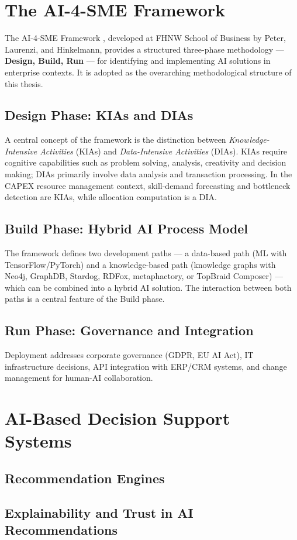 \section{The AI-4-SME Framework}
\label{sec:ai4sme_background}

The AI-4-SME Framework \citep{peter2025ai4sme}, developed at FHNW School of Business by Peter, Laurenzi, and Hinkelmann, provides a structured three-phase methodology — \textbf{Design, Build, Run} — for identifying and implementing AI solutions in enterprise contexts. It is adopted as the overarching methodological structure of this thesis.

\subsection{Design Phase: KIAs and DIAs}

A central concept of the framework is the distinction between \textit{Knowledge-Intensive Activities} (KIAs) and \textit{Data-Intensive Activities} (DIAs). KIAs require cognitive capabilities such as problem solving, analysis, creativity and decision making; DIAs primarily involve data analysis and transaction processing. In the CAPEX resource management context, skill-demand forecasting and bottleneck detection are KIAs, while allocation computation is a DIA.

\subsection{Build Phase: Hybrid AI Process Model}

The framework defines two development paths — a data-based path (ML with TensorFlow/PyTorch) and a knowledge-based path (knowledge graphs with Neo4j, GraphDB, Stardog, RDFox, metaphactory, or TopBraid Composer) — which can be combined into a hybrid AI solution. The interaction between both paths is a central feature of the Build phase.

\subsection{Run Phase: Governance and Integration}

Deployment addresses corporate governance (GDPR, EU AI Act), IT infrastructure decisions, API integration with ERP/CRM systems, and change management for human-AI collaboration.

\section{AI-Based Decision Support Systems}
\label{sec:dss}

\subsection{Recommendation Engines}

\subsection{Explainability and Trust in AI Recommendations}
